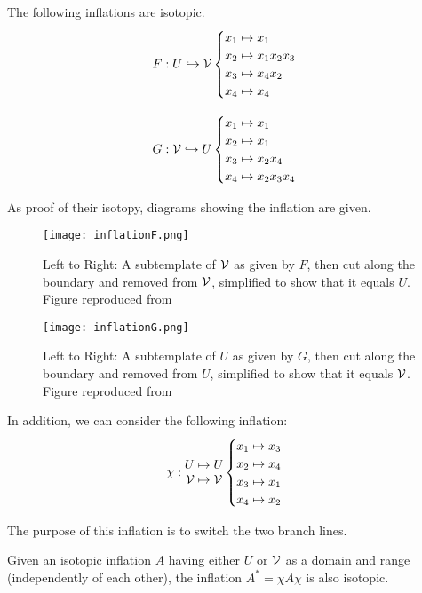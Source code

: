 \documentclass[paper.tex]{subfiles}
\begin{document}
\begin{prop}
    The following inflations are isotopic.
$$F: U \hookrightarrow \mathcal{V} \begin{cases} x_1 \mapsto x_1 \\ x_2 \mapsto x_1 x_2 x_3 \\ x_3 \mapsto x_4 x_2 \\ x_4 \mapsto x_4 \end{cases}$$

$$G: \mathcal{V} \hookrightarrow U \begin{cases} x_1 \mapsto x_1 \\ x_2 \mapsto x_1 \\ x_3 \mapsto x_2 x_4 \\ x_4 \mapsto x_2 x_3 x_4 \end{cases}$$
\end{prop}

As proof of their isotopy, diagrams showing the inflation are given.


\begin{figure}[h]
  \centering
  \texttt{[image: inflationF.png]}
  \caption{Left to Right: A subtemplate of $\mathcal{V}$ as given by $F$, then cut along the boundary and removed from $\mathcal{V}$, simplified to show that it equals $U$. Figure reproduced from~\cite{ghs1997}}\label{fig:isotopicF}
\end{figure}

\begin{figure}[h]
  \centering
  \texttt{[image: inflationG.png]}
  \caption{Left to Right: A subtemplate of $U$ as given by $G$, then cut along the boundary and removed from $U$, simplified to show that it equals $\mathcal{V}$. Figure reproduced from~\cite{ghs1997}}\label{fig:isotopicG}
\end{figure}


In addition, we can consider the following inflation: $$\chi: \begin{matrix} U \mapsto U \\ \mathcal{V} \mapsto \mathcal{V} \end{matrix} \begin{cases} x_1 \mapsto x_3 \\ x_2 \mapsto x_4 \\ x_3 \mapsto x_1 \\ x_4 \mapsto x_2 \end{cases}$$

    The purpose of this inflation is to switch the two branch lines.

    \begin{lemma}[Ghrist 1997]
        Given an isotopic inflation $A$ having either $U$ or $\mathcal{V}$ as a domain and range (independently of each other), the inflation $A^* = \chi A \chi$ is also isotopic.
    \end{lemma}
\end{document}
